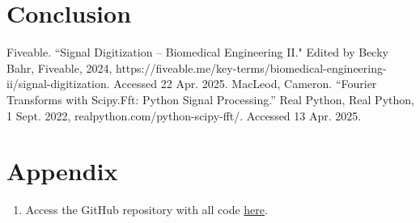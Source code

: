\documentclass{article}
\begin{document}

\section{Conclusion}

\begin{thebibliography}{9}
     Fiveable. ``Signal Digitization – Biomedical Engineering II." Edited by Becky Bahr, Fiveable, 2024, https://fiveable.me/key-terms/biomedical-engineering-ii/signal-digitization. Accessed 22 Apr. 2025.
     MacLeod, Cameron. “Fourier Transforms with Scipy.Fft: Python Signal Processing.” Real Python, Real Python, 1 Sept. 2022, realpython.com/python-scipy-fft/. Accessed 13 Apr. 2025. 
\end{thebibliography}

\section{Appendix}
\begin{enumerate}
    \item Access the GitHub repository with all code \href{https://github.com/margheritatonon/approximation-II-assignment}{here}.
\end{enumerate}
\end{document}
